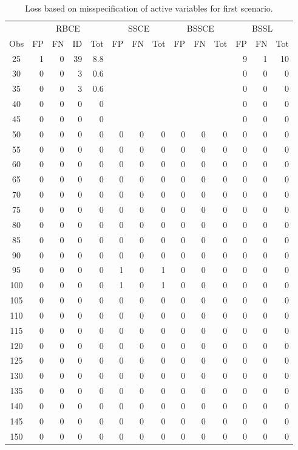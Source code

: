 \documentclass[preprint,12pt]{elsarticle}
\begin{document}
\begin{table}[ht]
\caption{Loss based on misspecification of active variables for first scenario.}\label{tab:misspec1}
\centering
\small
\begin{tabular}{|c||rrr|r||rr|r||rr|r||rr|r|}
  \hline
  &\multicolumn{4}{c||}{RBCE}&\multicolumn{3}{c||}{SSCE}
  &\multicolumn{3}{c||}{BSSCE}&\multicolumn{3}{c|}{BSSL}\\
  \cline{2-14}
 Obs & FP & FN & ID & Tot & FP & FN & Tot & FP & FN & Tot & FP & FN & Tot \\ 
  \hline
25 & 1 & 0 & 39 & 8.8 &  &  &  &  &  &  & 9 & 1 & 10 \\ 
  30 & 0 & 0 & 3 & 0.6 &  &  &  &  &  &  & 0 & 0 & 0 \\ 
  35 & 0 & 0 & 3 & 0.6 &  &  &  &  &  &  & 0 & 0 & 0 \\ 
  40 & 0 & 0 & 0 & 0 &  &  &  &  &  &  & 0 & 0 & 0 \\ 
  45 & 0 & 0 & 0 & 0 &  &  &  &  &  &  & 0 & 0 & 0 \\ 
  50 & 0 & 0 & 0 & 0 & 0 & 0 & 0 & 0 & 0 & 0 & 0 & 0 & 0 \\ 
  55 & 0 & 0 & 0 & 0 & 0 & 0 & 0 & 0 & 0 & 0 & 0 & 0 & 0 \\ 
  60 & 0 & 0 & 0 & 0 & 0 & 0 & 0 & 0 & 0 & 0 & 0 & 0 & 0 \\ 
  65 & 0 & 0 & 0 & 0 & 0 & 0 & 0 & 0 & 0 & 0 & 0 & 0 & 0 \\ 
  70 & 0 & 0 & 0 & 0 & 0 & 0 & 0 & 0 & 0 & 0 & 0 & 0 & 0 \\ 
  75 & 0 & 0 & 0 & 0 & 0 & 0 & 0 & 0 & 0 & 0 & 0 & 0 & 0 \\ 
  80 & 0 & 0 & 0 & 0 & 0 & 0 & 0 & 0 & 0 & 0 & 0 & 0 & 0 \\ 
  85 & 0 & 0 & 0 & 0 & 0 & 0 & 0 & 0 & 0 & 0 & 0 & 0 & 0 \\ 
  90 & 0 & 0 & 0 & 0 & 0 & 0 & 0 & 0 & 0 & 0 & 0 & 0 & 0 \\ 
  95 & 0 & 0 & 0 & 0 & 1 & 0 & 1 & 0 & 0 & 0 & 0 & 0 & 0 \\ 
  100 & 0 & 0 & 0 & 0 & 1 & 0 & 1 & 0 & 0 & 0 & 0 & 0 & 0 \\ 
  105 & 0 & 0 & 0 & 0 & 0 & 0 & 0 & 0 & 0 & 0 & 0 & 0 & 0 \\ 
  110 & 0 & 0 & 0 & 0 & 0 & 0 & 0 & 0 & 0 & 0 & 0 & 0 & 0 \\ 
  115 & 0 & 0 & 0 & 0 & 0 & 0 & 0 & 0 & 0 & 0 & 0 & 0 & 0 \\ 
  120 & 0 & 0 & 0 & 0 & 0 & 0 & 0 & 0 & 0 & 0 & 0 & 0 & 0 \\ 
  125 & 0 & 0 & 0 & 0 & 0 & 0 & 0 & 0 & 0 & 0 & 0 & 0 & 0 \\ 
  130 & 0 & 0 & 0 & 0 & 0 & 0 & 0 & 0 & 0 & 0 & 0 & 0 & 0 \\ 
  135 & 0 & 0 & 0 & 0 & 0 & 0 & 0 & 0 & 0 & 0 & 0 & 0 & 0 \\ 
  140 & 0 & 0 & 0 & 0 & 0 & 0 & 0 & 0 & 0 & 0 & 0 & 0 & 0 \\ 
  145 & 0 & 0 & 0 & 0 & 0 & 0 & 0 & 0 & 0 & 0 & 0 & 0 & 0 \\ 
  150 & 0 & 0 & 0 & 0 & 0 & 0 & 0 & 0 & 0 & 0 & 0 & 0 & 0 \\ 
   \hline
\end{tabular}
\end{table}
\end{document}
